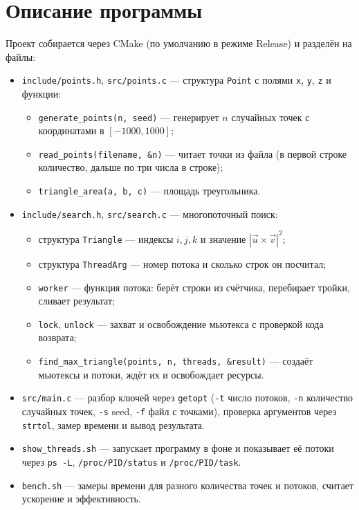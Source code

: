\section{Описание программы}
Проект собирается через CMake (по умолчанию в режиме Release) и разделён на файлы:

\begin{itemize}
\item \texttt{include/points.h}, \texttt{src/points.c} --- структура \texttt{Point} с полями \texttt{x}, \texttt{y}, \texttt{z} и функции:
  \begin{itemize}
  \item \texttt{generate\_points(n, seed)} --- генерирует $n$ случайных точек с координатами в $[-1000, 1000]$;
  \item \texttt{read\_points(filename, \&n)} --- читает точки из файла (в первой строке количество, дальше по три числа в строке);
  \item \texttt{triangle\_area(a, b, c)} --- площадь треугольника.
  \end{itemize}
\item \texttt{include/search.h}, \texttt{src/search.c} --- многопоточный поиск:
  \begin{itemize}
  \item структура \texttt{Triangle} --- индексы $i, j, k$ и значение $|\vec{u} \times \vec{v}|^2$;
  \item структура \texttt{ThreadArg} --- номер потока и сколько строк он посчитал;
  \item \texttt{worker} --- функция потока: берёт строки из счётчика, перебирает тройки, сливает результат;
  \item \texttt{lock}, \texttt{unlock} --- захват и освобождение мьютекса с проверкой кода возврата;
  \item \texttt{find\_max\_triangle(points, n, threads, \&result)} --- создаёт мьютексы и потоки, ждёт их и освобождает ресурсы.
  \end{itemize}
\item \texttt{src/main.c} --- разбор ключей через \texttt{getopt} (\texttt{-t} число потоков, \texttt{-n} количество случайных точек, \texttt{-s} seed, \texttt{-f} файл с точками), проверка аргументов через \texttt{strtol}, замер времени и вывод результата.
\item \texttt{show\_threads.sh} --- запускает программу в фоне и показывает её потоки через \texttt{ps -L}, \texttt{/proc/PID/status} и \texttt{/proc/PID/task}.
\item \texttt{bench.sh} --- замеры времени для разного количества точек и потоков, считает ускорение и эффективность.
\end{itemize}

